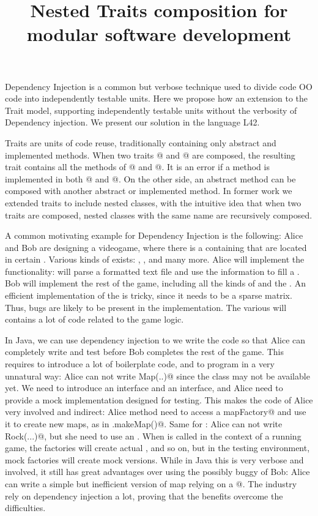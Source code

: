 \documentclass[a4paper,twoside,british,9pt]{extarticle}
\begin{document}
\title{Nested Traits composition for modular software development}
\date{}
\maketitle
\vspace{-10ex}
Dependency Injection is a common but verbose technique
used to divide code OO code into independently testable units.
Here we propose how an extension to the Trait model,
supporting independently testable units without
the verbosity of Dependency injection.
We present our solution in the language L42.

Traits are units of code reuse, traditionally containing
only abstract and implemented methods.
When two traits @ and @ are composed, the resulting trait contains
all the methods of @ and @.
It is an error if a method \Q@m@ is implemented in both @ and @.
On the other side, an abstract method can be composed with
another abstract or implemented method.
In former work we extended traits to include nested classes, with the intuitive
idea that when two traits are composed, nested classes with the same name are recursively composed.


A common motivating example for Dependency Injection is the following:
Alice and Bob are designing a videogame, where there
is a \Q@Map@ containing \Q@Item@s that are located in certain
\Q@Point@s.
Various kinds of \Q@Item@s exists: \Q@Wall@s, \Q@Rock@s,
\Q@Tree@s and many more. Alice will implement the \Q@load@ functionality:
\Q@load@ will parse a formatted text file
and use the information to fill a \Q@Map@.
Bob will implement the rest of the game, 
including all the kinds of \Q@Item@s and
the \Q@Map@.
An efficient implementation of the \Q@Map@ is tricky,
since it needs to be a sparse matrix.
Thus, bugs are likely to be present in the \Q@Map@ implementation.
The various \Q@Item@s will contains a lot of code related to the game logic.

In Java, we can use dependency injection to we write the code so that Alice can 
completely write and test \Q@load@ before
Bob completes the rest of the game.
This requires to introduce a lot of boilerplate code, and 
to program in a very unnatural way:
Alice can not write \Q@new Map(..)@
since the \Q@Map@ class may not be available yet.
We need to introduce an \Q@IMap@ interface and an \Q@IMapFactory@ interface,
and Alice need to provide
a mock implementation designed for testing.
This makes the code of Alice very involved and indirect:
Alice \Q@load@ method need to access a \Q@IMapFactory mapFactory@
and use it to create new maps, as in \Q@mapFactory.makeMap()@.
Same for \Q@Item@s: Alice can not write \Q@new Rock(...)@,
but she need to use an \Q@IItemFactory@.
When \Q@load@ is called in the context of a running game,
the factories will create actual \Q@Map@s, \Q@Rock@s
and so on, but in the testing environment, 
mock factories will create mock versions.
While in Java this is very verbose and involved,
it still has great advantages over using the
possibly buggy \Q@Map@ of Bob: Alice can 
write a simple but inefficient version of map relying
on a @.
The industry rely on dependency injection a lot, proving
that the benefits overcome the difficulties.
\end{document}
